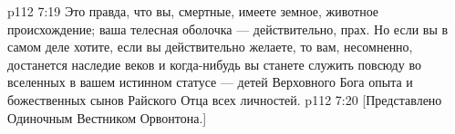 \vs p112 7:19 \pc Это правда, что вы, смертные, имеете земное, животное происхождение; ваша телесная оболочка --- действительно, прах. Но если вы в самом деле хотите, если вы действительно желаете, то вам, несомненно, достанется наследие веков и когда\hyp{}нибудь вы станете служить повсюду во вселенных в вашем истинном статусе --- детей Верховного Бога опыта и божественных сынов Райского Отца всех личностей.
\vsetoff
\vs p112 7:20 [Представлено Одиночным Вестником Орвонтона.]
